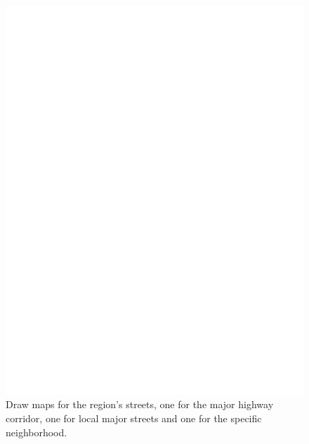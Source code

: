 \documentclass{report}
\begin{document}
 \begin{figure}
	\centering
	\includegraphics[width=5in]{imageserver/uploadimages/image3.png}
	\caption[streetmaps]
	{Draw maps for the region's streets, one for the major highway corridor, one for local major streets and one for the specific neighborhood.}
\end{figure}
\end{document}

